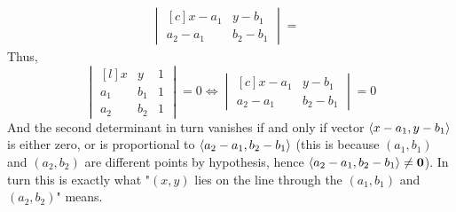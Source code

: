 \documentclass[8pt]{article} %
\begin{document}
\begin{description}
{\[\begin{array}{rr}
		\begin{vmatrix*}[c]x-a_1&y-b_1\\a_2-a_1&b_2-b_1\end{vmatrix*}
		= &
		\end{array}\]
		Thus, 
		\[\begin{vmatrix*}[l]x&y&1\\a_1&b_1&1\\a_2&b_2&1\end{vmatrix*}=0\iff\begin{vmatrix*}[c]x-a_1&y-b_1\\a_2-a_1&b_2-b_1\end{vmatrix*}=0
		\]
		And the second determinant in turn vanishes if and only if vector $\left<x-a_1,y-b_1\right>$ is either zero, or is proportional
		to $\left<a_2-a_1,b_2-b_1\right>$ (this is because $(a_1,b_1)$ and $(a_2,b_2)$ are different points by hypothesis, hence
		$\left<a_2-a_1,b_2-b_1\right>\neq\mathbf{0}$). In turn this is exactly what "$(x,y)$ lies on the line through 
		the $(a_1,b_1)$ and $(a_2,b_2)$" means.
		}

\end{description}
\end{document}
